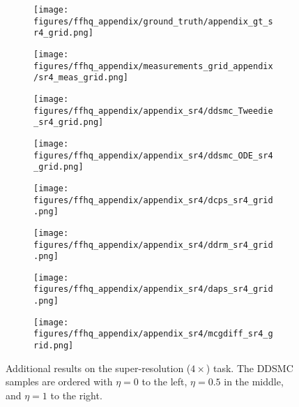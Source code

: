 \begin{figure*}[h!]
    \centering
    \begin{subfigure}[t]{0.083\linewidth}
        \centering
        \texttt{[image: figures/ffhq\_appendix/ground\_truth/appendix\_gt\_sr4\_grid.png]}
    \end{subfigure}%
    \hfill
    \begin{subfigure}[t]{0.083\linewidth}
        \centering
        \texttt{[image: figures/ffhq\_appendix/measurements\_grid\_appendix/sr4\_meas\_grid.png]}
    \end{subfigure}%
    \hfill
    \begin{subfigure}[t]{0.25\linewidth}
        \centering
        \texttt{[image: figures/ffhq\_appendix/appendix\_sr4/ddsmc\_Tweedie\_sr4\_grid.png]}
    \end{subfigure}%
    \hfill
    \begin{subfigure}[t]{0.25\linewidth}
        \centering
        \texttt{[image: figures/ffhq\_appendix/appendix\_sr4/ddsmc\_ODE\_sr4\_grid.png]}
    \end{subfigure}%
    \hfill
    \begin{subfigure}[t]{0.083\linewidth}
        \centering
        \texttt{[image: figures/ffhq\_appendix/appendix\_sr4/dcps\_sr4\_grid.png]}
    \end{subfigure}%
    \begin{subfigure}[t]{0.083\linewidth}
        \centering
        \texttt{[image: figures/ffhq\_appendix/appendix\_sr4/ddrm\_sr4\_grid.png]}
    \end{subfigure}%
    \begin{subfigure}[t]{0.083\linewidth}
        \centering
        \texttt{[image: figures/ffhq\_appendix/appendix\_sr4/daps\_sr4\_grid.png]}
    \end{subfigure}%
    \begin{subfigure}[t]{0.083\linewidth}
        \centering
        \texttt{[image: figures/ffhq\_appendix/appendix\_sr4/mcgdiff\_sr4\_grid.png]}
    \end{subfigure}%
\caption{Additional results on the super-resolution ($4\times$) task. The DDSMC samples are ordered with $\eta=0$ to the left, $\eta=0.5$ in the middle, and $\eta=1$ to the right. }
\label{fig:ffhq_appendix_sr4}
\end{figure*}
